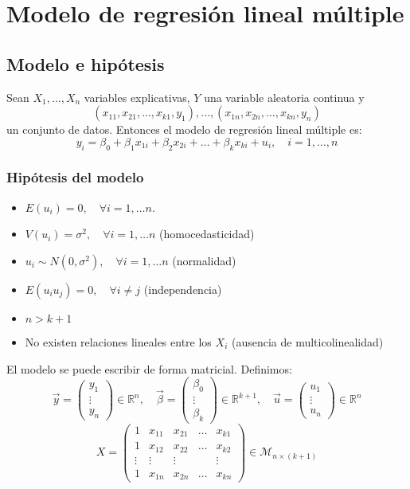 \chapter{Modelo de regresión lineal múltiple}
\section{Modelo e hipótesis}
Sean $X_1, \dots, X_n$ variables explicativas, $Y$ una variable aleatoria continua y
$$(x_{11}, x_{21}, \dots, x_{k1}, y_1), \dots, (x_{1n}, x_{2n}, \dots, x_{kn}, y_n)$$
un conjunto de datos.
Entonces el modelo de regresión lineal múltiple es:
$$y_i = \beta_0 + \beta_1 x_{1i} + \beta_2 x_{2i} + \dots + \beta_k x_{ki} + u_i, \quad i = 1, \dots, n$$

\subsection*{Hipótesis del modelo}
\begin{itemize}
    \item $E(u_i) = 0, \quad \forall i = 1, \dots n$.
    \item $V(u_i) = \sigma^2, \quad \forall i = 1, \dots n$ (homocedasticidad)
    \item $u_i \sim N(0, \sigma^2), \quad \forall i = 1, \dots n$ (normalidad)
    \item $E(u_i u_j) = 0, \quad \forall i \neq j$ (independencia)
    \item $n > k+1$
    \item No existen relaciones lineales entre los $X_i$ (ausencia de multicolinealidad)
\end{itemize}
El modelo se puede escribir de forma matricial.
Definimos:
$$\vec{y} = \begin{pmatrix}
        y_1 \\ \vdots \\ y_n
    \end{pmatrix} \in \mathbb{R}^n, \quad
    \vec{\beta} = \begin{pmatrix}
        \beta_0 \\ \vdots \\ \beta_k
    \end{pmatrix} \in \mathbb{R}^{k+1}, \quad
    \vec{u} = \begin{pmatrix}
        u_1 \\ \vdots \\ u_n
    \end{pmatrix} \in \mathbb{R}^n$$
$$X = \begin{pmatrix}
        1      & x_{11} & x_{21} & \dots & x_{k1} \\
        1      & x_{12} & x_{22} & \dots & x_{k2} \\
        \vdots & \vdots & \vdots &       & \vdots \\
        1      & x_{1n} & x_{2n} & \dots & x_{kn}
    \end{pmatrix} \in \mathcal{M}_{n \times (k+1)}$$
